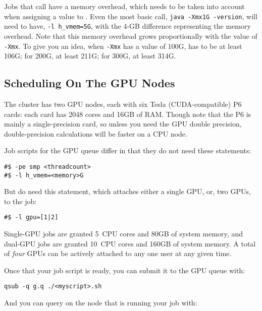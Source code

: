 \documentclass{easychair}
\begin{document}
Jobs that call  have a memory overhead, which needs to be taken 
into account when assigning a value to . Even the most basic 
 call, \texttt{java -Xmx1G -version}, will need to have,
\texttt{-l h\_vmem=5G}, with the 4-GB difference representing the memory overhead. 
Note that this memory overhead grows proportionally with the value of
\texttt{-Xmx}. To give you an idea, when \texttt{-Xmx} has a value of 100G,
 has to be at least 106G; for 200G, at least 211G; for 300G, at least 314G.


\subsection{Scheduling On The GPU Nodes}

The cluster has two GPU nodes, each with six Tesla (CUDA-compatible) P6
cards: each card has 2048 cores and 16GB of RAM. Though note that the P6
is mainly a single-precision card, so unless you need the GPU double
precision, double-precision calculations will be faster on a CPU node.

Job scripts for the GPU queue differ in that they do not need these
statements:

\begin{verbatim}
#$ -pe smp <threadcount>
#$ -l h_vmem=<memory>G
\end{verbatim}

But do need this statement, which attaches either a single GPU, or, two
GPUs, to the job:

\begin{verbatim}
#$ -l gpu=[1|2]
\end{verbatim}

Single-GPU jobs are granted 5~CPU cores and 80GB of system memory, and
dual-GPU jobs are granted 10~CPU cores and 160GB of system memory. A
total of \emph{four} GPUs can be actively attached to any one user at any given
time.

Once that your job script is ready, you can submit it to the GPU queue
with:

\begin{verbatim}
qsub -q g.q ./<myscript>.sh
\end{verbatim}

And you can query  on the node that is running your job with:
\end{document}
